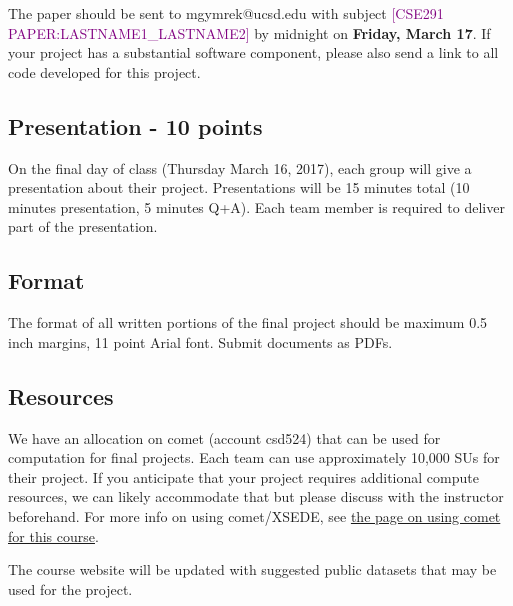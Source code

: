 \documentclass[12pt]{article}
\begin{document}
The paper should be sent to mgymrek@ucsd.edu with subject \textcolor{purple}{[CSE291 PAPER:LASTNAME1\_LASTNAME2]} by midnight on \textbf{Friday, March 17}. If your project has a substantial software component, please also send a link to all code developed for this project.

\subsection*{Presentation - 10 points}
On the final day of class (Thursday March 16, 2017), each group will give a presentation about their project. Presentations will be 15 minutes total (10 minutes presentation, 5 minutes Q+A). Each team member is required to deliver part of the presentation.

\subsection*{Format}
The format of all written portions of the final project should be maximum 0.5 inch margins, 11 point Arial font. Submit documents as PDFs.

\subsection*{Resources}
We have an allocation on comet (account csd524) that can be used for computation for final projects. Each team can use approximately 10,000 SUs for their project. If you anticipate that your project requires additional compute resources, we can likely accommodate that but please discuss with the instructor beforehand. For more info on using comet/XSEDE, see \href{https://gymreklab.github.io/teaching/personal_genomics/using_comet.html}{the page on using comet for this course}.

The course website will be updated with suggested public datasets that may be used for the project.
\end{document}
